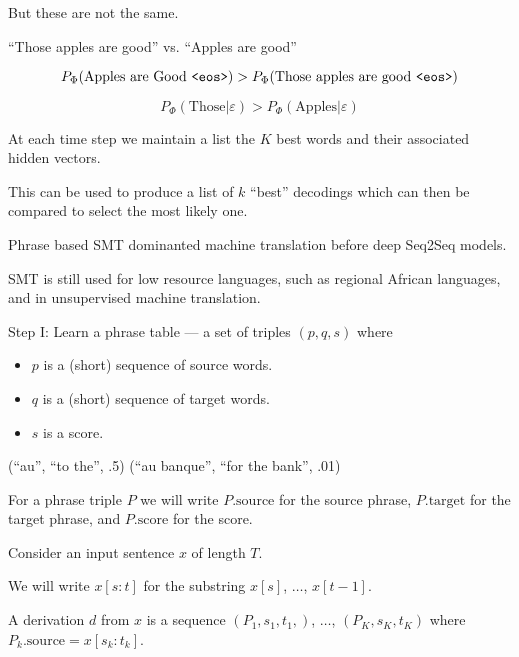 {\vfill
But these are not the same.


``Those apples are good'' vs. ``Apples are good''

\vfill
$$P_\Phi(\mbox{Apples are Good {\tt <eos>}}) > P_\Phi(\mbox{Those apples are good {\tt <eos>}})$$

\vfill
$$P_\Phi(\mbox{Those}|\varepsilon) > P_\Phi(\mbox{Apples}|\varepsilon)$$
    

At each time step we maintain a list the $K$ best words and their associated hidden vectors.

\vfill
This can be used to produce a list of $k$ ``best'' decodings which can then be compared to select
the most likely one.



Phrase based SMT dominanted machine translation before deep Seq2Seq models.

\vfill
SMT is still used for low resource languages, such as regional African languages, and in unsupervised machine translation.



Step I:   Learn a phrase table --- a set of triples $(p,q,s)$ where

\vfill
\begin{itemize}
\item $p$ is a (short) sequence of source words.
  \vfill
\item $q$ is a (short) sequence of target words.
  \vfill
\item $s$ is a score.
\end{itemize}

\vfill
(``au'', ``to the'', .5) \hfill (``au banque'', ``for the bank'', .01)

\vfill
For a phrase triple $P$ we will write $P.\mathrm{source}$ for the source phrase, $P.\mathrm{target}$ for the target phrase, and $P.\mathrm{score}$ for the score.


Consider an input sentence $x$ of length $T$.

\vfill
We will write $x[s:t]$ for the substring $x[s]$, $\ldots$, $x[t-1]$.

\vfill
A derivation $d$ from $x$ is a sequence $(P_1,s_1,t_1,)$, $\ldots$, $(P_K,s_K,t_K)$ where $P_k.\mathrm{source} = x[s_k:t_k]$.

}
